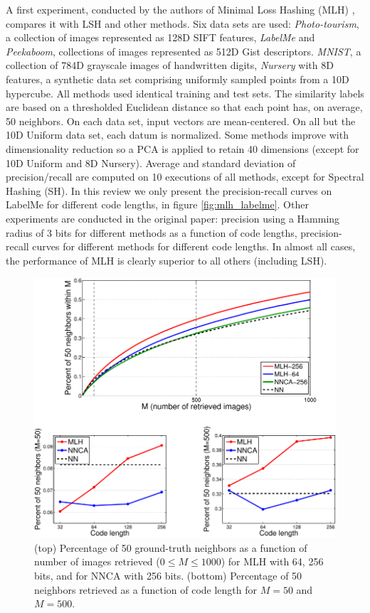 A first experiment, conducted by the authors of Minimal Loss Hashing (MLH) \cite{norouzi2011minimal}, compares it with LSH and other methods. Six data sets are used: \textit{Photo-tourism}, a collection of images represented as 128D SIFT features, \textit{LabelMe} and \textit{Peekaboom}, collections of images represented as 512D Gist descriptors. \textit{MNIST}, a collection of 784D grayscale images of handwritten digits, \textit{Nursery} with 8D features, a synthetic data set comprising uniformly sampled points from a 10D hypercube. All methods used identical training and test sets. The similarity labels are based on a thresholded Euclidean distance so that each point has, on average, 50 neighbors. On each data set, input vectors are mean-centered. On all but the 10D Uniform data set, each datum is normalized. Some methods improve with dimensionality reduction so a PCA is applied to retain 40 dimensions (except for 10D Uniform and 8D Nursery). Average and standard deviation of precision/recall are computed on 10 executions of all methods, except for Spectral Hashing (SH). In this review we only present the precision-recall curves on LabelMe for different code lengths, in figure \ref{fig:mlh_labelme}. Other experiments are conducted in the original paper: precision using a Hamming radius of 3 bits for different methods as a function of code lengths, precision-recall curves for different methods for different code lengths. In almost all cases, the performance of MLH is clearly superior to all others (including LSH).

\begin{figure}
	\includegraphics[width=\textwidth]{semantic_search_mlh_nnca.png}
	\caption{(top) Percentage of 50 ground-truth neighbors as a function of number of images retrieved ($0 \leq M \leq 1000$) for MLH with 64, 256 bits, and for NNCA with 256 bits. (bottom) Percentage of 50 neighbors retrieved as a function of code length for $M=50$ and $M=500$. \cite{norouzi2011minimal}}
	\label{fig:semantic_search_mlh_nnca}	
\end{figure}

